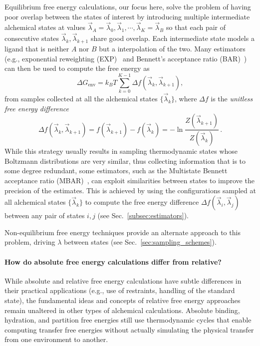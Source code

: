 \documentclass[9pt,bestpractices]{livecoms}
\begin{document}
Equilibrium free energy calculations, our focus here, solve the problem of having poor overlap between the states of interest by introducing multiple intermediate alchemical states at values $\vec{\lambda}_A = \vec{\lambda}_0, \vec{\lambda}_1, \cdots, \vec{\lambda}_K = \vec{\lambda}_B$ so that each pair of consecutive states $\vec{\lambda}_k, \vec{\lambda}_{k+1}$ share good overlap.
Each intermediate state models a ligand that is neither $A$ nor $B$ but a interpolation of the two.
Many estimators (e.g., exponential reweighting (EXP)~\cite{zwanzig1954hightemperature} and Bennett's acceptance ratio (BAR)~\cite{bennett1976efficient,shirts2003equilibrium}) can then be used to compute the free energy as
\begin{equation}
    \Delta G_{\mathrm{env}} = k_BT \sum_{k=0}^{K-1} \Delta f(\vec{\lambda}_k, \vec{\lambda}_{k+1}),
\end{equation}
from samples collected at all the alchemical states $\{\vec{\lambda}_k \}$, where $\Delta f$ is the \emph{unitless free energy difference}
\begin{equation}
    \Delta f(\vec{\lambda}_k, \vec{\lambda}_{k+1}) = f(\vec{\lambda}_{k+1}) - f(\vec{\lambda}_k) = - \ln \frac{Z(\vec{\lambda}_{k+1})}{Z(\vec{\lambda}_k)} \, .
\end{equation}
While this strategy usually results in sampling thermodynamic states whose Boltzmann distributions are very similar, thus collecting information that is to some degree redundant, some estimators, such as the Multistate Bennett acceptance ratio (MBAR)~\cite{shirts2008statisticallya}, can exploit similarities between states to improve the precision of the estimates. This is achieved by using the configurations sampled at all alchemical states $\{\vec{\lambda}_k \}$ to compute the free energy difference $\Delta f(\vec{\lambda}_i, \vec{\lambda}_{j})$ between any pair of states $i,j$ (see Sec.~\ref{subsec:estimators}).

Non-equilibrium free energy techniques provide an alternate approach to this problem, driving $\lambda$ between states (see Sec.~\ref{sec:sampling_schemes}).~\cite{jarzynski1997nonequilibrium,jarzynski1998equilibrium,crooks2000pathensemble, gapsys2020large}

\paragraph{How do absolute free energy calculations differ from relative?}

While absolute and relative free energy calculations have subtle differences in their practical applications (e.g., use of restraints, handling of the standard state), the fundamental ideas and concepts of relative free energy approaches remain unaltered in other types of alchemical calculations.
Absolute binding, hydration, and partition free energies still use thermodynamic cycles that enable computing transfer free energies without actually simulating the physical transfer from one environment to another.
\end{document}
